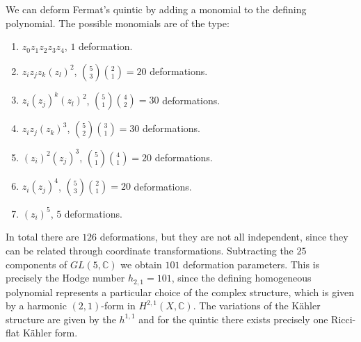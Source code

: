 We can deform Fermat's quintic by adding a monomial to the defining polynomial.
The possible monomials are of the type:
\begin{enumerate}
  \item $z_0z_1z_2z_3z_4$, $1$ deformation.
  \item $z_i z_j z_k(z_l)^2$, ${5}\choose{3}$${2}\choose{1}$$=20$ deformations. 
  \item $z_i(z_j)^k(z_l)^2$, ${5}\choose{1}$${4}\choose{2}$$=30$ deformations.
  \item $z_i z_j(z_k)^3$, ${5}\choose{2}$${3}\choose{1}$$=30$ deformations.
  \item $(z_i)^2(z_j)^3$, ${5}\choose{1}$${4}\choose{1}$$=20$ deformations.
  \item $z_i(z_j)^4$, ${5}\choose{3}$${2}\choose{1}$$=20$ deformations.
  \item $(z_i)^5$, $5$ deformations.
\end{enumerate}
In total there are $126$ deformations, but they are not all independent, since they 
can be related through coordinate transformations.
Subtracting the $25$ components of $GL(5,\mathbb C)$ we obtain $101$ deformation parameters.
This is precisely the Hodge number $h_{2,1}=101$, since the defining homogeneous polynomial  
represents a particular choice of the complex structure, which is given by a
harmonic $(2,1)$-form in $H^{2,1}(X,\mathbb C)$.
The variations of the Kähler structure are given by the $h^{1,1}$ and
for the quintic there exists precisely one Ricci-flat Kähler form.

